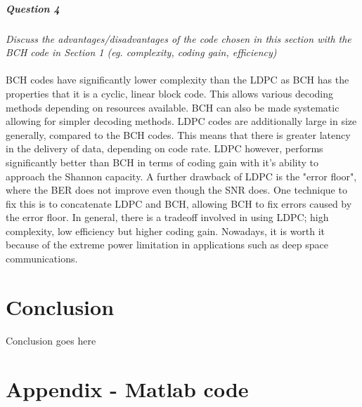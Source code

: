 \documentclass[a4paper]{article}
\begin{document}
\subsubsection{Question 4} \textit{Discuss the advantages/disadvantages of the code chosen in this section with the BCH code in Section 1 (eg. complexity, coding gain, efficiency)}\\
\\
BCH codes have significantly lower complexity than the LDPC as BCH has the properties that it is a cyclic, linear block code. This allows various decoding methods depending on resources available. BCH can also be made systematic allowing for simpler decoding methods. LDPC codes are additionally large in size generally, compared to the BCH codes. This means that there is greater latency in the delivery of data, depending on code rate. LDPC however, performs significantly better than BCH in terms of coding gain with it's ability to approach the Shannon capacity. A further drawback of LDPC is the "error floor", where the BER does not improve even though the SNR does. One technique to fix this is to concatenate LDPC and BCH, allowing BCH to fix errors caused by the error floor. In general, there is a tradeoff involved in using LDPC; high complexity, low efficiency but higher coding gain. Nowadays, it is worth it because of the extreme power limitation in applications such as deep space communications.

\part*{Conclusion}
Conclusion goes here




\hfill
\newpage

\part*{Appendix - Matlab code}
\end{document}
